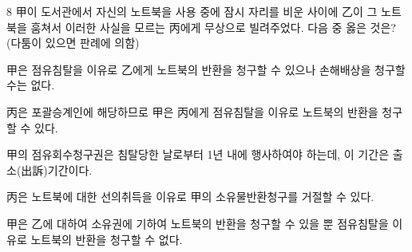 \begin{question}{8}
甲이 도서관에서 자신의 노트북을 사용 중에 잠시 자리를 비운 사이에 乙이 그 노트북을 훔쳐서 이러한 사실을 모르는 丙에게 무상으로 빌려주었다. 다음 중 옳은 것은? (다툼이 있으면 판례에 의함)
\begin{choices}
  \item 甲은 점유침탈을 이유로 乙에게 노트북의 반환을 청구할 수 있으나 손해배상을 청구할 수는 없다.
  \item 丙은 포괄승계인에 해당하므로 甲은 丙에게 점유침탈을 이유로 노트북의 반환을 청구할 수 있다.
  \item 甲의 점유회수청구권은 침탈당한 날로부터 1년 내에 행사하여야 하는데, 이 기간은 출소(出訴)기간이다.
  \item 丙은 노트북에 대한 선의취득을 이유로 甲의 소유물반환청구를 거절할 수 있다.
  \item 甲은 乙에 대하여 소유권에 기하여 노트북의 반환을 청구할 수 있을 뿐 점유침탈을 이유로 노트북의 반환을 청구할 수 없다.
\end{choices}
\end{question}
